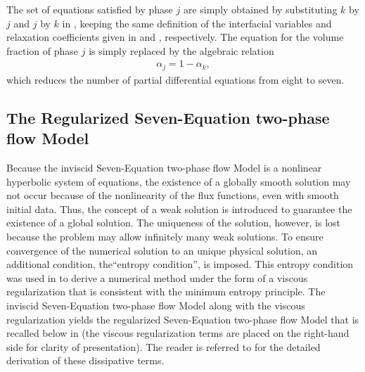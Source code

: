 \documentclass[preprint,10pt]{elsarticle}
\begin{document}
The set of equations satisfied by phase $j$ are simply obtained by substituting $k$ by $j$ and $j$ by $k$ in , keeping 
the same definition of the interfacial variables and relaxation coefficients given in  and , respectively. The 
equation for the volume fraction of phase $j$ 
is simply replaced by the algebraic relation
%
\begin{align}
 \alpha_{j}= 1 - \alpha_{k}, \nonumber
\end{align}
%
which reduces the number of partial differential equations from eight to seven. %
%
\subsection{The Regularized Seven-Equation two-phase flow Model}\label{sec:ref-sem}
%
Because the inviscid Seven-Equation two-phase flow Model is a nonlinear hyperbolic system of equations, the existence of a 
globally smooth solution may not occur because of the nonlinearity of the flux functions, even with smooth initial data. Thus, the concept of a weak
solution is introduced to guarantee the existence of a global solution. The uniqueness of the solution, however, is lost because the problem may
allow infinitely many weak solutions. To ensure convergence of the numerical solution to an unique physical solution, an additional condition, 
the``entropy condition'', is imposed. This entropy condition was used 
in \cite{Marco_paper_sem} to derive a numerical method under the form of a viscous regularization that is consistent with the minimum entropy principle. 
The inviscid Seven-Equation two-phase flow Model along with the viscous 
regularization yields the regularized Seven-Equation two-phase flow Model that is recalled below in  
(the viscous regularization terms are placed on the right-hand side for clarity of presentation). The reader 
is referred to \cite{Marco_paper_sem} for the detailed derivation of these dissipative terms.
%
\end{document}
